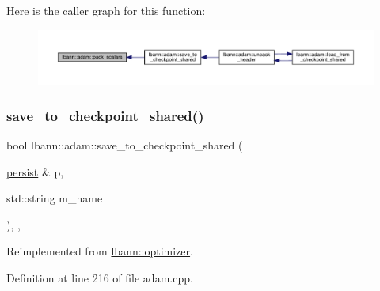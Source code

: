 Here is the caller graph for this function\+:\nopagebreak
\begin{figure}[H]
\begin{center}
\leavevmode
\includegraphics[width=350pt]{classlbann_1_1adam_a43e941b596c5d1cc68b795b0399398c4_icgraph}
\end{center}
\end{figure}
\mbox{\label{classlbann_1_1adam_a8070db0a451bdbc6e86200eaa14f6ac7}} 
\subsubsection{\texorpdfstring{save\+\_\+to\+\_\+checkpoint\+\_\+shared()}{save\_to\_checkpoint\_shared()}}
{\footnotesize\ttfamily bool lbann\+::adam\+::save\+\_\+to\+\_\+checkpoint\+\_\+shared (\begin{DoxyParamCaption}\item[{\hyperlink{classlbann_1_1persist}{persist} \&}]{p,  }\item[{std\+::string}]{m\+\_\+name }\end{DoxyParamCaption})\hspace{0.3cm}{\ttfamily [override]}, {\ttfamily [private]}, {\ttfamily [virtual]}}



Reimplemented from \hyperlink{classlbann_1_1optimizer_afed10c6d8c5bd922f95075abeff711ce}{lbann\+::optimizer}.



Definition at line 216 of file adam.\+cpp.


